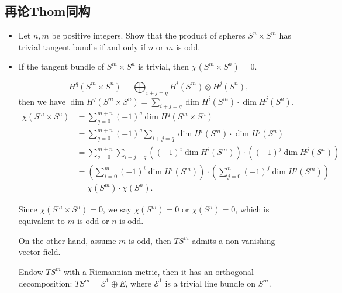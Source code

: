 \subsection{再论Thom同构}
\begin{itemize}
    \item[7.] Let $n,m$ be positive integers. 
    Show that the product of spheres $S^n\times S^m$ 
    has trivial tangent bundle if and only if $n$ or $m$ is odd.
    \item[\textbf{Proof:}] 
    \qquad If the tangent bundle of $S^m\times S^n$ is trivial, 
    then $\chi(S^m\times S^n)=0$.\par
    $$H^q(S^m\times S^n)=\bigoplus_{i+j=q} H^i(S^m)\otimes H^j(S^n),$$
    then we have $\dim H^q(S^m\times S^n)
    =\sum\limits_{i+j=q} \dim H^i(S^m)\cdot \dim H^j(S^n)$.
        \begin{align*}
            \chi(S^m\times S^n) &=\sum_{q=0}^{m+n} (-1)^q\dim H^q(S^m\times S^n)\\
            &=\sum_{q=0}^{m+n} (-1)^q\sum_{i+j=q} \dim H^i(S^m)\cdot \dim H^j(S^n)\\
            &=\sum_{q=0}^{m+n}\sum_{i+j=q} 
            \left( (-1)^i \dim H^i(S^m) \right) \cdot \left( (-1)^j \dim H^j(S^n) \right)\\
            &=\left( \sum_{i=0}^m (-1)^i \dim H^i(S^m) \right) \cdot 
            \left( \sum_{j=0}^n (-1)^j \dim H^j(S^m) \right)\\
            &=\chi(S^m)\cdot \chi(S^n).
        \end{align*}
        
        \qquad Since $\chi(S^m\times S^n)=0$, we say $\chi(S^m)=0$ or $\chi(S^n)=0$, 
        which is equivalent to $m$ is odd or $n$ is odd.

        \qquad On the other hand, assume $m$ is odd, 
        then $TS^m$ admits a non-vanishing vector field.

        \qquad Endow $TS^m$ with a Riemannian metric, 
        then it has an orthogonal decomposition: $TS^m=\mathcal{E}^1 \oplus E$, 
        where $\mathcal{E}^1$ is a trivial line bundle on $S^m$.


\end{itemize}
